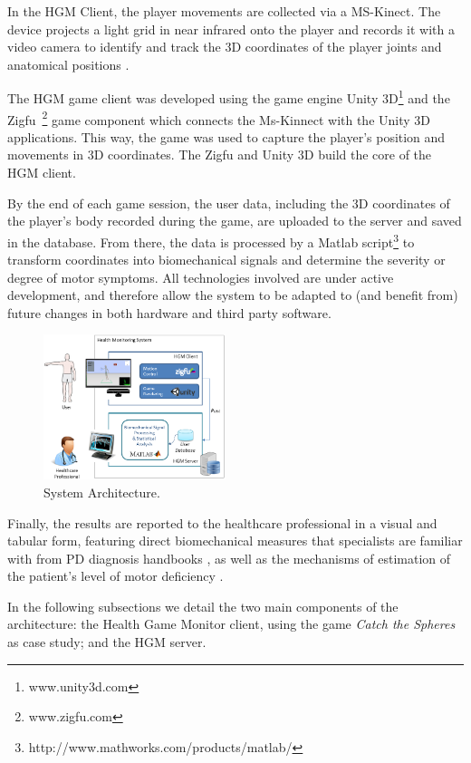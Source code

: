 \documentclass[10pt, conference, compsocconf]{IEEEtran}
\begin{document}
In the HGM Client, the player movements are collected via a MS-Kinect. The device projects a light grid in near infrared onto the player and records it with a video camera to identify and track the 3D coordinates of the player joints and anatomical positions \cite{mcginnis2013biomechanics}. 

The HGM game client was developed using the game engine Unity 3D\footnote{www.unity3d.com} and the Zigfu~\footnote{www.zigfu.com} game component which connects the Ms-Kinnect with the Unity 3D applications. This way, the game was used to capture the player's position and movements in 3D coordinates. The Zigfu and Unity 3D build the core of the HGM client.

By the end of each game session, the user data, including the 3D coordinates of the player's body recorded during the game, are uploaded to the server and saved in the database. From there, the data is processed by a Matlab script\footnote
{http://www.mathworks.com/products/matlab/} to transform coordinates into biomechanical signals and determine the severity or degree of motor symptoms. All technologies involved are under active development, and therefore allow the system to be adapted to (and benefit from) future changes in both hardware and third party software. 

\begin{figure}[!htb]
	\centering
	\includegraphics[width=0.475\textwidth]{img/systemarchitecture3.png}
	\caption{System Architecture.}
	\label{img:sysarch}
\end{figure}

Finally, the results are reported to the healthcare professional in a visual and tabular form, featuring direct biomechanical measures that specialists are familiar with from PD diagnosis handbooks \cite{national2006parkinson}, as well as the mechanisms of estimation of the patient's level of motor deficiency \cite{national2006parkinson}.

In the following subsections we detail the two main components of the architecture: the Health Game Monitor client, using the game \textit{Catch the Spheres} as case study; and the HGM server.
\end{document}
